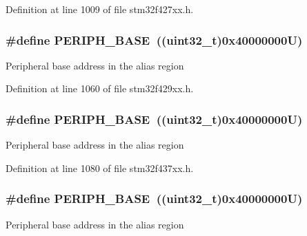 Definition at line 1009 of file stm32f427xx.\+h.

\subsubsection[{\texorpdfstring{P\+E\+R\+I\+P\+H\+\_\+\+B\+A\+SE}{PERIPH_BASE}}]{\setlength{\rightskip}{0pt plus 5cm}\#define P\+E\+R\+I\+P\+H\+\_\+\+B\+A\+SE~((uint32\+\_\+t)0x40000000\+U)}\hypertarget{group___peripheral__memory__map_ga9171f49478fa86d932f89e78e73b88b0}{}\label{group___peripheral__memory__map_ga9171f49478fa86d932f89e78e73b88b0}
Peripheral base address in the alias region 

Definition at line 1060 of file stm32f429xx.\+h.

\subsubsection[{\texorpdfstring{P\+E\+R\+I\+P\+H\+\_\+\+B\+A\+SE}{PERIPH_BASE}}]{\setlength{\rightskip}{0pt plus 5cm}\#define P\+E\+R\+I\+P\+H\+\_\+\+B\+A\+SE~((uint32\+\_\+t)0x40000000\+U)}\hypertarget{group___peripheral__memory__map_ga9171f49478fa86d932f89e78e73b88b0}{}\label{group___peripheral__memory__map_ga9171f49478fa86d932f89e78e73b88b0}
Peripheral base address in the alias region 

Definition at line 1080 of file stm32f437xx.\+h.

\subsubsection[{\texorpdfstring{P\+E\+R\+I\+P\+H\+\_\+\+B\+A\+SE}{PERIPH_BASE}}]{\setlength{\rightskip}{0pt plus 5cm}\#define P\+E\+R\+I\+P\+H\+\_\+\+B\+A\+SE~((uint32\+\_\+t)0x40000000\+U)}\hypertarget{group___peripheral__memory__map_ga9171f49478fa86d932f89e78e73b88b0}{}\label{group___peripheral__memory__map_ga9171f49478fa86d932f89e78e73b88b0}
Peripheral base address in the alias region 

